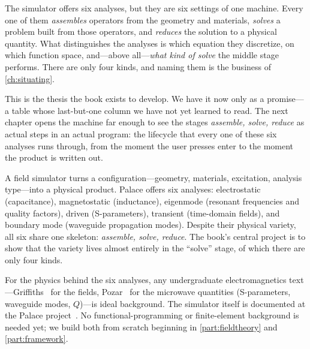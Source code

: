 \begin{keyidea}
The simulator offers six analyses, but they are six settings of one machine.
Every one of them \emph{assembles} operators from the geometry and materials,
\emph{solves} a problem built from those operators, and \emph{reduces} the
solution to a physical quantity. What distinguishes the analyses is which
equation they discretize, on which function space, and---above all---\emph{what
kind of solve} the middle stage performs. There are only four kinds, and naming
them is the business of \cref{ch:situating}.
\end{keyidea}

This is the thesis the book exists to develop. We have it now only as a
promise---a table whose last-but-one column we have not yet learned to read. The
next chapter opens the machine far enough to see the stages \emph{assemble,
solve, reduce} as actual steps in an actual program: the lifecycle that every
one of these six analyses runs through, from the moment the user presses
\textsf{enter} to the moment the product is written out.

\summarysection
A field simulator turns a configuration---geometry, materials, excitation,
analysis type---into a physical product. Palace offers six analyses:
electrostatic (capacitance), magnetostatic (inductance), eigenmode (resonant
frequencies and quality factors), driven (S-parameters), transient (time-domain
fields), and boundary mode (waveguide propagation modes). Despite their physical
variety, all six share one skeleton: \emph{assemble, solve, reduce}. The book's
central project is to show that the variety lives almost entirely in the
``solve'' stage, of which there are only four kinds.

\furtherreading
For the physics behind the six analyses, any undergraduate electromagnetics
text---Griffiths~\citep{griffiths2017} for the fields, Pozar~\citep{pozar2011}
for the microwave quantities (S-parameters, waveguide modes, $Q$)---is ideal
background. The simulator itself is documented at the Palace
project~\citep{palace2023}. No functional-programming or finite-element
background is needed yet; we build both from scratch beginning in
\cref{part:fieldtheory} and \cref{part:framework}.


